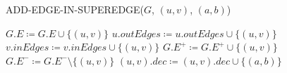 \begin{algorithm}[H]
    \caption{ADD-EDGE-IN-SUPEREDGE($G$, $(u, v)$, $(a, b)$)}\label{alg:add-edge-in-superedge}
    \begin{algorithmic}[1]
            \State $G.E \coloneqq G.E \cup \{(u, v)\}$
            \State $u.outEdges \coloneqq u.outEdges \cup \{(u, v)\}$
            \State $v.inEdges \coloneqq v.inEdges \cup \{(u, v)\}$
                \State $G.E^+ \coloneqq G.E^+ \cup \{(u, v)\}$
            \Else
                \State $G.E^- \coloneqq G.E^- \setminus \{(u, v)\}$
            \EndIf
        \EndIf
        \State $(u, v).dec \coloneqq (u, v).dec \cup \{(a, b)\}$
    \end{algorithmic}
\end{algorithm}